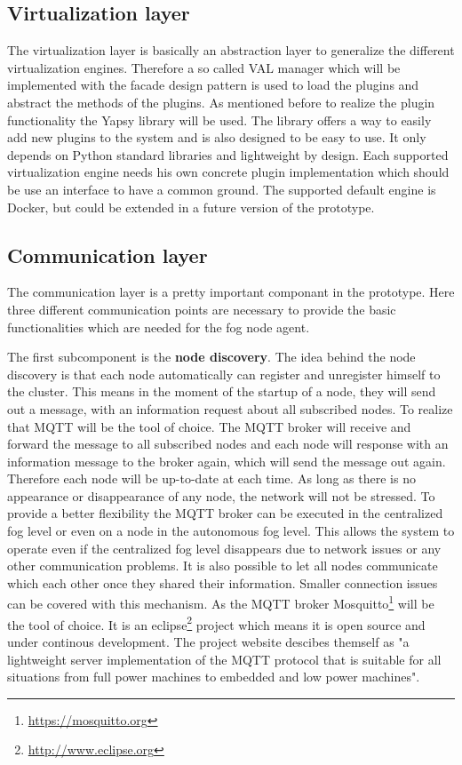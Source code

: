 \subsection{Virtualization layer}
The virtualization layer is basically an abstraction layer to generalize the different virtualization engines.
Therefore a so called \ac{VAL} manager which will be implemented with the facade design pattern is used to load the plugins and abstract the methods of the plugins.
As mentioned before to realize the plugin functionality the Yapsy library will be used.
The library offers a way to easily add new plugins to the system and is also designed to be easy to use.
It only depends on Python standard libraries and lightweight by design.
Each supported virtualization engine needs his own concrete plugin implementation which should be use an interface to have a common ground.
The supported default engine is Docker, but could be extended in a future version of the prototype.

\subsection{Communication layer}
\label{subsection:CommunicationLayer}
The communication layer is a pretty important componant in the prototype.
Here three different communication points are necessary to provide the basic functionalities which are needed for the fog node agent.

The first subcomponent is the \textbf{node discovery}.
The idea behind the node discovery is that each node automatically can register and unregister himself to the cluster.
This means in the moment of the startup of a node, they will send out a message, with an information request about all subscribed nodes.
To realize that \ac{MQTT} will be the tool of choice.
The \ac{MQTT} broker will receive and forward the message to all subscribed nodes and each node will response with an information message to the broker again, which will send the message out again.
Therefore each node will be up-to-date at each time.
As long as there is no appearance or disappearance of any node, the network will not be stressed.
To provide a better flexibility the \ac{MQTT} broker can be executed in the centralized fog level or even on a node in the autonomous fog level.
This allows the system to operate even if the centralized fog level disappears due to network issues or any other communication problems.
It is also possible to let all nodes communicate which each other once they shared their information.
Smaller connection issues can be covered with this mechanism.
As the \ac{MQTT} broker Mosquitto\footnote{\url{https://mosquitto.org}} will be the tool of choice.
It is an eclipse\footnote{\url{http://www.eclipse.org}} project which means it is open source and under continous development.
The project website descibes themself as "a lightweight server implementation of the MQTT protocol that is suitable for all situations from full power machines to embedded and low power machines"\autocite{Eclipse:Mosquitto}.


